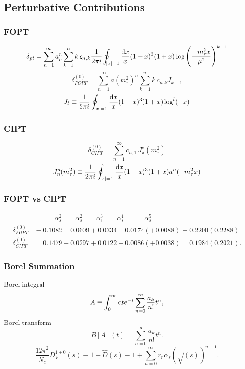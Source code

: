 \documentclass[fleqn]{beamer}
\begin{document}
\subsection{Perturbative Contributions}
\begin{frame}
  \frametitle{FOPT}
  \begin{equation}
    \delta_{pt} = \sum_{n=1}^\infty a_\mu^n \sum_{k=1}^n k\, c_{n,k} \frac{1}{2 \pi i} \oint_{\abs{x}=1} \frac{\dif x}{x} (1-x)^3 (1+x) \log \left( \frac{-m_\tau^2 x}{\mu^2} \right)^{k-1}
  \end{equation}
  \begin{equation}
    \delta_{FOPT}^{(0)} = \sum_{n=1}^\infty a(m_\tau^2)^n \sum_{k=1}^n k\, c_{n,k} J_{k-1}
  \end{equation}
  \begin{equation}
    J_l \equiv \frac{1}{2\pi i} \oint_{\abs{x}=1} \frac{\dif x}{x} (1-x)^3 (1+x) \log^l(-x)
  \end{equation}
\end{frame}
\begin{frame}
  \frametitle{CIPT}
  \begin{equation}
    \delta_{CIPT}^{(0)} = \sum_{n=1}^\infty c_{n,1}\, J_n^a(m_\tau^2)
  \end{equation}
  \begin{equation}
    J_n^a(m_\tau^2) \equiv \frac{1}{2 \pi i} \oint_{\abs{x}=1} \frac{\dif x}{x} (1-x)^3 (1+x) a^n (-m_\tau^2 x)
  \end{equation}
\end{frame} 
\begin{frame}
  \frametitle{FOPT vs CIPT}
  \begin{align}
    & \quad\qquad \alpha_s^2 \qquad \alpha_s^2 \qquad \alpha_s^3 \qquad \alpha_s^4 \quad\qquad \alpha_s^5 \nonumber\\
    \delta_{FOPT}^{(0)} &= 0.1082 + 0.0609 + 0.0334 + 0.0174 (+ 0.0088) = 0.2200 (0.2288) \\
    \delta_{CIPT}^{(0)} &= 0.1479 + 0.0297 + 0.0122 + 0.0086 (+ 0.0038) = 0.1984 (0.2021).
  \end{align}
\end{frame}
\begin{frame}
  \frametitle{Borel Summation}
  Borel integral
  \begin{equation}
    A \equiv \int_0^\infty \dif t e^{-t} \sum_{n=0}^\infty \frac{a_k}{n!} t^n,
  \end{equation}
  Borel transform
  \begin{equation}
    B[A](t) = \sum_{n=0}^\infty \frac{a_k}{n!} t^n.
  \end{equation}
  \begin{equation}
    \frac{12 \pi^2}{N_c} D_V^{1+0}(s) \equiv 1 + \widehat D(s) \equiv 1 + \sum_{n=0}^{\infty} r_n \alpha_s(\sqrt{(s)})^{n+1}.
  \end{equation}
\end{frame}
\end{document}
